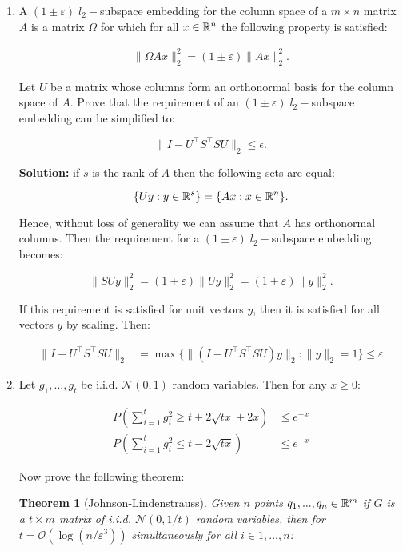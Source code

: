 \documentclass[11pt]{article}
\newcommand\bigO[1]{{\ensuremath{\mathcal{O}(#1)}}}
\newtheorem{theorem}{Theorem}
\begin{document}
\begin{enumerate}
    \item A $(1 \pm \varepsilon) \; l_2-$subspace embedding for the column space of a $m \times n$ matrix $A$ is a matrix $\Omega$ for which for all $x \in \mathbb{R}^{n}$ the following property is satisfied:
    
    \begin{align}
    \label{def:eps embedding}
    \|\Omega A x\|_2^2 = (1 \pm \varepsilon)\|A x\|_2^2.
    \end{align}

Let $U$ be a matrix whose columns form an orthonormal basis for the column space of $A$. Prove that the requirement of an $(1 \pm \varepsilon) \; l_2-$subspace embedding can be simplified to:

\[ \|I - U^\top S^\top S U \|_2 \leq \epsilon. \] 

\textbf{Solution: } if $s$ is the rank of $A$ then the following sets are equal:

\[ \{Uy : y \in \mathbb{R}^s\} = \{ Ax : x \in \mathbb{R}^n \}. \]

Hence, without loss of generality we can assume that $A$ has orthonormal columns. Then the requirement for a $(1 \pm \varepsilon) \; l_2-$subspace embedding becomes:

\[ \|SUy\|_2^2 = (1 \pm \varepsilon )\|Uy\|_2^2 = (1 \pm \varepsilon) \|y\|_2^2. \]

If this requirement is satisfied for unit vectors $y$, then it is satisfied for all vectors $y$ by scaling. Then:

\begin{align*}
\|I - U^\top S^\top S U \|_2 &= \max\{ \| (I - U^\top S^\top S U) y \|_2 : \|y\|_2 = 1 \} \leq \varepsilon
\end{align*}

\item Let $g_1, ..., g_t$ be i.i.d. $\mathcal{N}(0,1)$ random variables. Then for any $x \geq 0$:

\begin{align*}
P\left( \sum_{i = 1}^t g_i^2 \geq t + 2 \sqrt{tx} + 2x \right) &\leq e^{-x} \\
P\left( \sum_{i = 1}^t g_i^2 \leq t - 2 \sqrt{tx} \right) &\leq e^{-x}
\end{align*}

Now prove the following theorem:

\begin{theorem}[Johnson-Lindenstrauss]
\label{Lemma18}
Given $n$ points $q_1, ..., q_n \in \mathbb{R}^m$ if $G$ is a $t \times m$ matrix of i.i.d. $\mathcal{N}(0, 1/t)$ random variables, then for $t = \bigO{\log(n/\varepsilon^3)}$ simultaneously for all $i \in 1, ..., n$:


\end{theorem}
\end{enumerate}
\end{document}
